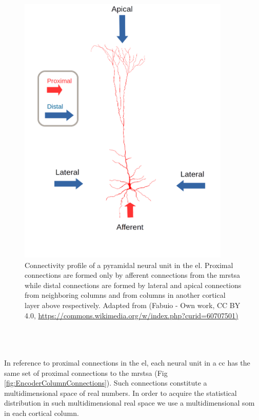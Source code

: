 \documentclass[10pt,letterpaper]{article}
\begin{document}
\begin{figure}[h!]
    \centering
    \includegraphics[width=0.9\textwidth]{PyramidalCell.png}
    \caption{Connectivity profile of a pyramidal neural unit in the \gls{el}.
    Proximal connections are formed only by afferent connections from the \gls{mrstsa}
    while distal connections are formed by lateral and apical connections from neighboring columns and
    from columns in another cortical layer above respectively.
    Adapted from 
    (Fabuio - Own work, CC BY 4.0, \url{https://commons.wikimedia.org/w/index.php?curid=60707501)}}
    \label{fig:PyramidalCell}
\end{figure}

\pagebreak

~\\
~\\
~\\

In reference to proximal connections in the \gls{el}, each neural unit in a \gls{cc} has the same set of
proximal connections to the \gls{mrstsa} (Fig \ref{fig:EncoderColumnConnections}).
Such connections constitute a multidimensional space of real numbers.
In order to acquire the statistical distribution in such multidimensional real space we use
a multidimensional \gls{som} in each cortical column.
\end{document}
